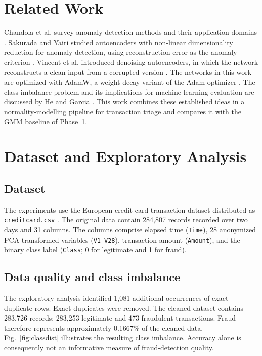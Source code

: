 \documentclass[conference]{IEEEtran}
\begin{document}
\section{Related Work}
Chandola et al. survey anomaly-detection methods and their application domains \cite{chandola2009}. Sakurada and Yairi studied autoencoders with non-linear dimensionality reduction for anomaly detection, using reconstruction error as the anomaly criterion \cite{sakurada2014}. Vincent et al. introduced denoising autoencoders, in which the network reconstructs a clean input from a corrupted version \cite{vincent2008}. The networks in this work are optimized with AdamW, a weight-decay variant of the Adam optimizer \cite{kingma2015}. The class-imbalance problem and its implications for machine learning evaluation are discussed by He and Garcia \cite{he2009}. This work combines these established ideas in a normality-modelling pipeline for transaction triage and compares it with the GMM baseline of Phase~1.

\section{Dataset and Exploratory Analysis}
\subsection{Dataset}
The experiments use the European credit-card transaction dataset distributed as \texttt{creditcard.csv} \cite{ulb_dataset,dalpozzolo2015}. The original data contain 284,807 records recorded over two days and 31 columns. The columns comprise elapsed time (\texttt{Time}), 28 anonymized PCA-transformed variables (\texttt{V1}--\texttt{V28}), transaction amount (\texttt{Amount}), and the binary class label (\texttt{Class}; 0 for legitimate and 1 for fraud).

\subsection{Data quality and class imbalance}
The exploratory analysis identified 1,081 additional occurrences of exact duplicate rows. Exact duplicates were removed. The cleaned dataset contains 283,726 records: 283,253 legitimate and 473 fraudulent transactions. Fraud therefore represents approximately 0.1667\% of the cleaned data. Fig.~\ref{fig:classdist} illustrates the resulting class imbalance. Accuracy alone is consequently not an informative measure of fraud-detection quality.
\end{document}

